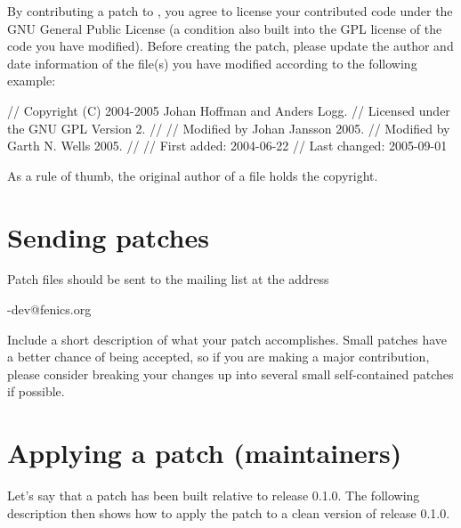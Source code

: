 By contributing a patch to \package{}, you agree to license your
contributed code under the GNU General Public License (a condition
also built into the GPL license of the code you have modified). Before
creating the patch, please update the author and date information of
the file(s) you have modified according to the following example:

\begin{code}
  // Copyright (C) 2004-2005 Johan Hoffman and Anders Logg.
  // Licensed under the GNU GPL Version 2.
  //
  // Modified by Johan Jansson 2005.
  // Modified by Garth N. Wells 2005.
  //
  // First added:  2004-06-22
  // Last changed: 2005-09-01
\end{code}

As a rule of thumb, the original author of a file holds the copyright.

\section{Sending patches}

Patch files should be sent to the \package{} mailing list at the address
\begin{code}
  \packagett{}-dev@fenics.org
\end{code}
Include a short description of what your patch accomplishes. Small
patches have a better chance of being accepted, so if you are making a
major contribution, please consider breaking your changes up into
several small self-contained patches if possible.

\section{Applying a patch (maintainers)}

Let's say that a patch has been built relative to \package{} release 0.1.0.
The following description then shows how to apply the patch to a clean
version of release 0.1.0.

